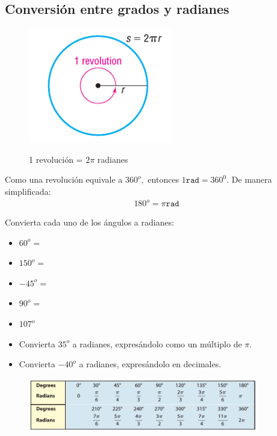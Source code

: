 \subsection{Conversión entre grados y radianes}
{}
	\begin{figure}[h]
		\centering
		\includegraphics[height=5cm,keepaspectratio=true]{./trig/sull6112.png}
		\label{fig:sull6112}
		\caption{1 revolución = $2\pi$ radianes}
	\end{figure}
	

{}
	Como una revolución equivale a $360^{o},$ entonces $1 \texttt{rad}=360^{0}.$ De manera simplificada:
	\begin{align*}
		180^{o}= \pi\texttt{rad}
	\end{align*}

{}
	\begin{problema}
		Convierta cada uno de los ángulos a radianes:
		\begin{itemize}
			\item $60^{o}=$ 
			\item $150^{o}=$ 
			\item $-45^{o}=$ 
			\item $90^{o}=$ 
			\item $107^{o}$ 
		\end{itemize}
		
	\end{problema}
	

{}
	\begin{problema}
		\begin{itemize}
			\item Convierta $35^{o}$ a radianes, expresándolo como un múltiplo de $\pi$.
			\item Convierta $-40^{o}$ a radianes, expresándolo en decimales. 
		\end{itemize}
		
	\end{problema}
	

{}
	\begin{figure}[h]
		\centering
		\includegraphics[width=10cm,keepaspectratio=true]{./trig/sull61t1.png}
		\label{fig:61t1}
	\end{figure}
	

